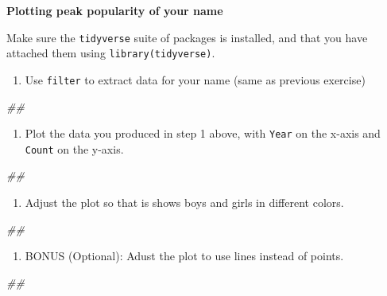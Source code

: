 \documentclass[]{book}
\newenvironment{Shaded}{\begin{snugshade}}{\end{snugshade}}
\newcommand{\CommentTok}[1]{\textcolor[rgb]{0.56,0.35,0.01}{\textit{#1}}}
\providecommand{\tightlist}{%
  \setlength{\itemsep}{0pt}\setlength{\parskip}{0pt}}
\begin{document}
\textbf{Plotting peak popularity of your name}

Make sure the \texttt{tidyverse} suite of packages is installed, and that you
have attached them using \texttt{library(tidyverse)}.

\begin{enumerate}
\def\labelenumi{\arabic{enumi}.}
\tightlist
\item
  Use \texttt{filter} to extract data for your name (same as previous exercise)
\end{enumerate}

\begin{Shaded}
\begin{Highlighting}[]
\CommentTok{##}
\end{Highlighting}
\end{Shaded}

\begin{enumerate}
\def\labelenumi{\arabic{enumi}.}
\setcounter{enumi}{1}
\tightlist
\item
  Plot the data you produced in step 1 above, with \texttt{Year} on the x-axis
  and \texttt{Count} on the y-axis.
\end{enumerate}

\begin{Shaded}
\begin{Highlighting}[]
\CommentTok{##}
\end{Highlighting}
\end{Shaded}

\begin{enumerate}
\def\labelenumi{\arabic{enumi}.}
\setcounter{enumi}{2}
\tightlist
\item
  Adjust the plot so that is shows boys and girls in different colors.
\end{enumerate}

\begin{Shaded}
\begin{Highlighting}[]
\CommentTok{##}
\end{Highlighting}
\end{Shaded}

\begin{enumerate}
\def\labelenumi{\arabic{enumi}.}
\setcounter{enumi}{3}
\tightlist
\item
  BONUS (Optional): Adust the plot to use lines instead of points.
\end{enumerate}

\begin{Shaded}
\begin{Highlighting}[]
\CommentTok{##}
\end{Highlighting}
\end{Shaded}
\end{document}
